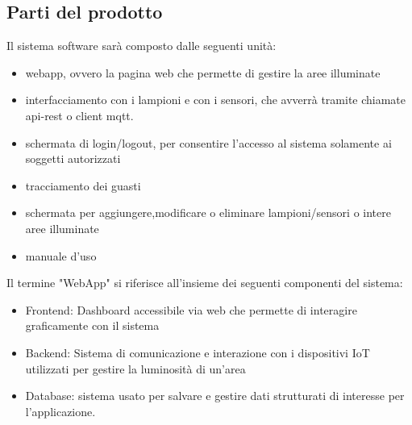 \documentclass[12pt]{article}
\begin{document}
\subsection{Parti del prodotto}
Il sistema software sarà composto dalle seguenti unità:
\begin{itemize}
	\item webapp, ovvero la pagina web che permette di gestire la aree illuminate
	\item interfacciamento con i lampioni e con i sensori, che avverrà tramite chiamate api-rest o client mqtt.
	\item schermata di login/logout, per consentire l'accesso al sistema solamente ai soggetti autorizzati
	\item tracciamento dei guasti
	\item schermata per aggiungere,modificare o eliminare lampioni/sensori o intere aree illuminate
	\item manuale d'uso
\end{itemize}
Il termine "WebApp" si riferisce all'insieme dei seguenti componenti del sistema:
\begin{itemize}
	\item Frontend: Dashboard accessibile via web che permette di interagire graficamente con il sistema
	\item Backend: Sistema di comunicazione e interazione con i dispositivi IoT utilizzati per gestire la luminosità di un'area
	\item Database: sistema usato per salvare e gestire dati strutturati di interesse per l'applicazione.
\end{itemize}
\end{document}
